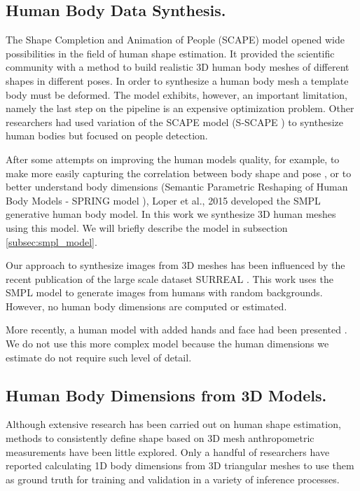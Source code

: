\documentclass[runningheads, orivec]{llncs}
\begin{document}
\subsection{Human Body Data Synthesis.}
The Shape Completion and Animation of People (SCAPE) model\cite{Anguelov.2005} 
opened wide possibilities in the field of 
human shape estimation. It 
provided the scientific community with a method to build realistic 3D human 
body meshes of different shapes in different poses. In order to synthesize a 
human body mesh a template body must be deformed. The model exhibits, however, an important limitation, namely the last 
step on the pipeline is an expensive optimization problem. Other researchers had used variation of the SCAPE model (S-SCAPE \cite{Pishchulin.2017}) to synthesize human bodies but focused on people detection.

After some attempts on improving the human models quality, for example, to make 
more 
easily capturing the correlation between body shape and pose 
\cite{HaslerSSRS09}, or to better understand body dimensions (Semantic 
Parametric Reshaping of Human Body Models - SPRING model 
\cite{Yang.2014}), Loper et al., 2015 \cite{Loper.2015} developed the SMPL generative 
human body model. In this work we synthesize 3D human meshes using this 
model. We will briefly describe the model in subsection \ref{subsec:smpl_model}.

Our approach to synthesize images from 3D meshes has been influenced 
by the recent publication of the large scale dataset SURREAL 
\cite{varol17_surreal}. This work uses the SMPL model 
to generate images 
from humans with random backgrounds. However, no human body dimensions are 
computed or estimated.

More recently, a human model with added hands and face had been presented \cite{Joo.2018}. We do not use this more complex model 
because the human dimensions we estimate do not require such level 
of detail.

\subsection{Human Body Dimensions from 3D Models.}
Although extensive research has been carried out on human shape estimation, 
methods to consistently define shape based on 3D mesh 
anthropometric measurements have been little explored. Only a handful of researchers 
have 
reported calculating 1D body dimensions from 3D triangular meshes to use them as ground truth for training and validation in a variety of inference processes.
 
\end{document}
